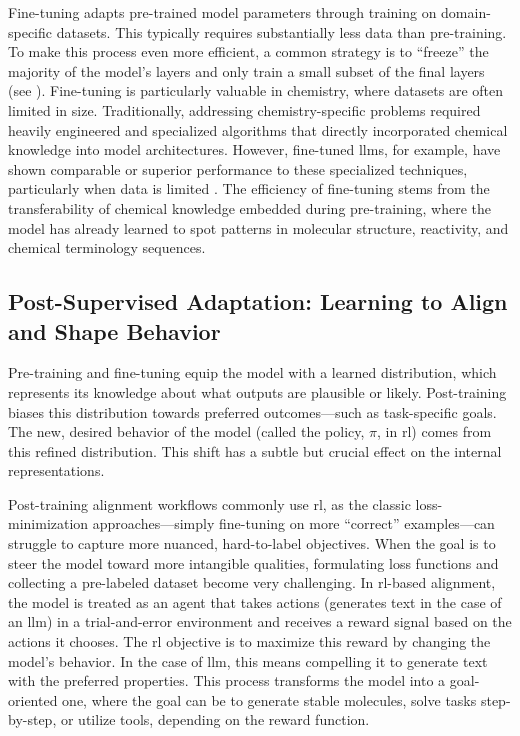 Fine-tuning adapts pre-trained model parameters through training on domain-specific datasets. 
This typically requires substantially less data than pre-training. To make this process even more efficient, a common strategy is to \enquote{freeze} the majority of the model’s layers and only train a small subset of the final layers (see ).
Fine-tuning is particularly valuable in chemistry, where datasets are often limited in size.
Traditionally, addressing chemistry-specific problems required heavily engineered and specialized algorithms that directly incorporated chemical knowledge into model architectures.  
However, fine-tuned \glspl{llm}, for example, have shown comparable or superior performance to these specialized techniques, particularly when data is limited \autocite{jablonka2024leveraging}. 
The efficiency of fine-tuning stems from the transferability of chemical knowledge embedded during pre-training, where the model has already learned to spot patterns in molecular structure, reactivity, and chemical terminology sequences. 

\subsection{Post-Supervised Adaptation: Learning to Align and Shape Behavior} \label{sec:rl}

Pre-training and fine-tuning equip the model with a learned distribution, which represents its knowledge about what outputs are plausible or likely. 
Post-training biases this distribution towards preferred outcomes---such as task-specific goals. 
The new, desired behavior of the model (called the policy, $\pi$, in \gls{rl}) comes from this refined distribution.
This shift has a subtle but crucial effect on the internal representations. 

Post-training alignment workflows commonly use \gls{rl}, as the classic loss-minimization approaches---simply fine-tuning on more \enquote{correct} examples---can struggle to capture more nuanced, hard-to-label objectives.\autocite{Huan2025mathLLM} When the goal is to steer the model toward more intangible qualities, formulating loss functions and collecting a pre-labeled dataset become very challenging. 
In \gls{rl}-based alignment, the model is treated as an agent that takes actions (generates text in the case of an \gls{llm}) in a trial-and-error environment and receives a reward signal based on the actions it chooses. The \gls{rl} objective is to maximize this reward by changing the model's behavior. 
In the case of \gls{llm}, this means compelling it to generate text with the preferred properties. This process transforms the model into a goal-oriented one, where the goal can be to generate stable molecules, solve tasks step-by-step, or utilize tools, depending on the reward function.

